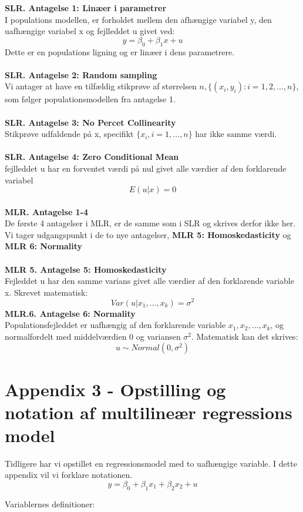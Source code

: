 \documentclass[
  10pt,
]{article}
\begin{document}
\textbf{SLR. Antagelse 1: Linæer i parametrer}\\
I populations modellen, er forholdet mellem den afhængige variabel y,
den uafhængige variabel x og fejlleddet u givet ved:
\[y=\beta_0+\beta_1x+u \] Dette er en populations ligning og er linæer i
dens parametrere.\\
~\\
\textbf{SLR. Antagelse 2: Random sampling}\\
Vi antager at have en tilfældig stikprøve af størrelsen
\(n,\{(x_i,y_i):i=1,2,...,n\}\), som følger populationsmodellen fra
antagelse 1.\\
~\\
\textbf{SLR. Antagelse 3: No Percet Collinearity}\\
Stikprøve udfaldende på x, specifikt \(\{x_i,i=1,...,n\}\) har ikke
samme værdi.\\
~\\
\textbf{SLR. Antagelse 4: Zero Conditional Mean}\\
fejlleddet u har en forventet værdi på nul givet alle værdier af den
forklarende variabel \[ E(u|x)=0\]\\
\textbf{MLR. Antagelse 1-4}\\
De første 4 antagelser i MLR, er de samme som i SLR og skrives derfor
ikke her. Vi tager udgangspunkt i de to nye antagelser,
\textbf{MLR 5: Homoskedasticity} og \textbf{MLR 6: Normality}\\
~\\
\textbf{MLR 5. Antagelse 5: Homoskedasticity}\\
Fejleddet u har den samme varians givet alle værdier af den forklarende
variable x. Skrevet matematisk: \[ Var(u|x_1,...,x_k)=\sigma^2\]
\textbf{MLR.6. Antagelse 6: Normality}\\
Populationsfejleddet er uafhængig af den forklarende variable
\(x_1,x_2,…,x_k\), og normalfordelt med middelværdien 0 og variansen
\(\sigma^2\). Matematisk kan det skrives: \[u \sim Normal(0,\sigma^2)\]

\newpage
\section{Appendix 3 - Opstilling og notation af multilineær regressions model}
\label{sec:AP3}

Tidligere har vi opstillet en regressionsmodel med to uafhængige
variable. I dette appendix vil vi forklare notationen.
\[ y=\beta_0+\beta_1x_1+\beta_2x_2+u\]

Variablernes definitioner: \begingroup \setlength{\tabcolsep}{2pt}
\renewcommand{\arraystretch}{0.5}
\end{document}
